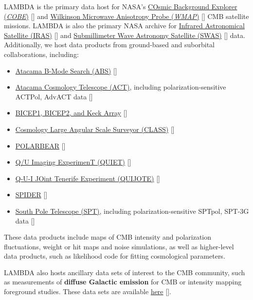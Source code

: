 \documentclass[twocolumn,tighten]{aastex631}
\newcommand{\COBE}{\textsl{COBE}}
\newcommand{\WMAP}{\textsl{WMAP}}
\begin{document}
LAMBDA is the primary data host for NASA's \href{https://lambda.gsfc.nasa.gov/product/cobe/}{COsmic Background Explorer (\COBE)} [] and \href{https://lambda.gsfc.nasa.gov/product/map/current/}{Wilkinson Microwave Anisotropy Probe (\WMAP)} [] CMB satellite missions. LAMBDA is also the primary NASA archive for \href{https://lambda.gsfc.nasa.gov/product/iras/}{Infrared Astronomical Satellite (IRAS)} [] and \href{https://lambda.gsfc.nasa.gov/product/swas/}{Submillimeter Wave Astronomy Satellite (SWAS)} [] data. Additionally, we host data products from ground-based and suborbital collaborations, including:
\begin{itemize}
\item \href{https://lambda.gsfc.nasa.gov/product/abs/}{Atacama B-Mode Search (ABS)} []
\item \href{https://lambda.gsfc.nasa.gov/product/act/}{Atacama Cosmology Telescope (ACT)}, including polarization-sensitive ACTPol, AdvACT data []
\item \href{https://lambda.gsfc.nasa.gov/product/bicepkeck/}{BICEP1, BICEP2, and Keck Array} [] 
\item \href{https://lambda.gsfc.nasa.gov/product/class/}{Cosmology Large Angular Scale Surveyor (CLASS)} []
\item \href{https://lambda.gsfc.nasa.gov/product/polarbear/}{POLARBEAR} []
\item \href{https://lambda.gsfc.nasa.gov/product/quiet/}{Q/U Imaging ExperimenT (QUIET)} []
\item \href{https://lambda.gsfc.nasa.gov/product/quijote/}{Q-U-I JOint Tenerife Experiment (QUIJOTE)} []
\item \href{https://lambda.gsfc.nasa.gov/product/spider/}{SPIDER} [] 
\item \href{https://lambda.gsfc.nasa.gov/product/spt/}{South Pole Telescope (SPT)}, including polarization-sensitive SPTpol, SPT-3G data [] 
\end{itemize}
These data products include maps of CMB intensity and polarization fluctuations, weight or hit maps and noise simulations, as well as higher-level data products, such as likelihood code for fitting cosmological parameters.

LAMBDA also hosts ancillary data sets of interest to the CMB community, such as measurements of {\bf diffuse Galactic emission} for CMB or intensity mapping foreground studies. These data sets are available \href{https://lambda.gsfc.nasa.gov/product/foreground/fg_diffuse.cfm}{here} [].
\end{document}

